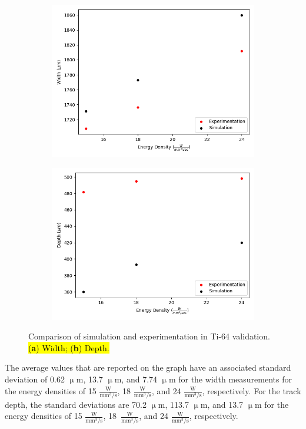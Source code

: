 \documentclass[metals,article,accept,pdftex,moreauthors]{Definitions/mdpi}
\begin{document}
\begin{figure}[H]
\begin{subfigure}[c]{0.45\textwidth}
\includegraphics[width=\textwidth]{ti64_melt_track_width}
\caption{\centering}
\label{fig:ti64_melt_track_width}
\end{subfigure}
\begin{subfigure}[c]{0.45\textwidth}\centering
\includegraphics[width=\textwidth]{ti64_melt_track_depth}
\caption{\centering}
\label{fig:ti64_melt_track_depth}
\end{subfigure}
\caption{Comparison of simulation and experimentation in Ti-64 validation. \hl{(\textbf{a}) Width; (\textbf{b}) Depth.}}
\label{fig:ti64_melt_track}
\end{figure}
The average values that are reported on the graph have an associated standard deviation 
of 0.62 $\upmu$m, 13.7 $\upmu$m, and 7.74 $\upmu$m for the width measurements for 
the energy densities of 15 $\frac{\text{W}}{\text{mm}^3/\text{s}}$, 18 
$\frac{\text{W}}{\text{mm}^3/\text{s}}$, and 24 $\frac{\text{W}}{\text{mm}^3/\text{s}}$, 
respectively.  For the track depth, the standard deviations are 70.2 $\upmu$m, 113.7 
$\upmu$m, and 13.7 $\upmu$m for the energy densities of 15 
$\frac{\text{W}}{\text{mm}^3/\text{s}}$, 18~$\frac{\text{W}}{\text{mm}^3/\text{s}}$, and 
24 $\frac{\text{W}}{\text{mm}^3/\text{s}}$, respectively.
\end{document}
